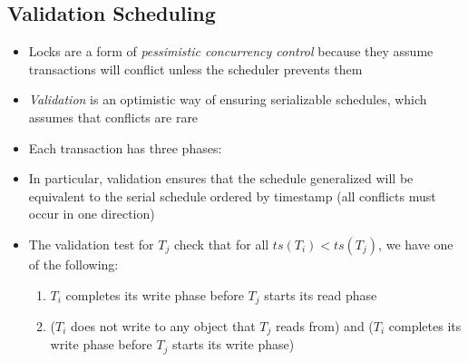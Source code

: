 \documentclass[a4paper]{article}
\begin{document}
\subsection{Validation Scheduling}
\begin{itemize}
\item Locks are a form of \emph{pessimistic concurrency control} because they assume transactions will conflict unless the scheduler prevents them
\item \emph{Validation} is an optimistic way of ensuring serializable schedules, which assumes that conflicts are rare
\item Each transaction has three phases:
\item In particular, validation ensures that the schedule generalized will be equivalent to the serial schedule ordered by timestamp (all conflicts must occur in one direction)
\item The validation test for $T_j$ check that for all $ts(T_i)<ts(T_j)$, we have one of the following:
\begin{enumerate}[label=\arabic*.]
\item $T_i$ completes its write phase before $T_j$ starts its read phase
\item ($T_i$ does not write to any object that $T_j$ reads from) and ($T_i$ completes its write phase before $T_j$ starts its write phase)
\end{enumerate}
\end{itemize}
\end{document}
